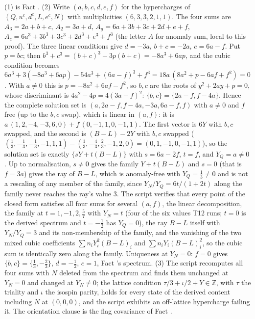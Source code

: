 (1) is Fact . (2) Write $(a, b, c, d, e, f)$ for the hypercharges of $(Q, u^{c}, d^{c}, L, e^{c}, N)$ with multiplicities $(6, 3, 3, 2, 1, 1)$. The four sums are $A_{3} = 2a + b + c$, $A_{2} = 3a + d$, $A_{g} = 6a + 3b + 3c + 2d + e + f$, $A_{c} = 6a^{3} + 3b^{3} + 3c^{3} + 2d^{3} + e^{3} + f^{3}$ (the letter $A$ for anomaly sum, local to this proof). The three linear conditions give $d = -3a$, $b + c = -2a$, $e = 6a - f$. Put $p = bc$; then $b^{3} + c^{3} = (b + c)^{3} - 3p(b + c) = -8a^{3} + 6ap$, and the cubic condition becomes $6a^{3} + 3(-8a^{3} + 6ap) - 54a^{3} + (6a - f)^{3} + f^{3} = 18a\,(8a^{2} + p - 6af + f^{2}) = 0$. With $a \neq 0$ this is $p = -8a^{2} + 6af - f^{2}$, so $b, c$ are the roots of $y^{2} + 2ay + p = 0$, whose discriminant is $4a^{2} - 4p = 4(3a - f)^{2}$: $\{b, c\} = \{2a - f, f - 4a\}$. Hence the complete solution set is $(a, 2a - f, f - 4a, -3a, 6a - f, f)$ with $a \neq 0$ and $f$ free (up to the $b, c$ swap), which is linear in $(a, f)$: it is $a\,(1, 2, -4, -3, 6, 0) + f\,(0, -1, 1, 0, -1, 1)$. The first vector is $6Y$ with $b, c$ swapped, and the second is $(B - L) - 2Y$ with $b, c$ swapped ($(\tfrac13, -\tfrac13, -\tfrac13, -1, 1, 1) - (\tfrac13, -\tfrac43, \tfrac23, -1, 2, 0) = (0, 1, -1, 0, -1, 1)$), so the solution set is exactly $\{sY + t(B - L)\}$ with $s = 6a - 2f$, $t = f$, and $Y_{Q} = a \neq 0$. Up to normalisation, $s \neq 0$ gives the family $Y + t(B - L)$ and $s = 0$ (that is $f = 3a$) gives the ray of $B - L$, which is anomaly-free with $Y_{Q} = \tfrac13 \neq 0$ and is not a rescaling of any member of the family, since $Y_{N}/Y_{Q} = 6t/(1 + 2t)$ along the family never reaches the ray's value $3$. The script verifies that every point of the closed form satisfies all four sums for several $(a, f)$, the linear decomposition, the family at $t = 1, -1, 2, \tfrac57$ with $Y_{N} = t$ (four of the six values T12 runs; $t = 0$ is the derived spectrum and $t = -\tfrac12$ has $Y_{Q} = 0$), the ray $B - L$ itself with $Y_{N}/Y_{Q} = 3$ and its non-membership of the family, and the vanishing of the two mixed cubic coefficients $\sum n_{i}Y_{i}^{2}(B - L)_{i}$ and $\sum n_{i}Y_{i}(B - L)_{i}^{2}$, so the cubic sum is identically zero along the family. Uniqueness at $Y_{N} = 0$: $f = 0$ gives $\{b, c\} = \{\tfrac13, -\tfrac23\}$, $d = -\tfrac12$, $e = 1$, Fact 's spectrum. (3) The script recomputes all four sums with $N$ deleted from the spectrum and finds them unchanged at $Y_{N} = 0$ and changed at $Y_{N} \neq 0$; the lattice condition $\tau/3 + \iota/2 + Y \in \mathbb{Z}$, with $\tau$ the triality and $\iota$ the isospin parity, holds for every state of the derived content including $N$ at $(0, 0, 0)$, and the script exhibits an off-lattice hypercharge failing it. The orientation clause is the flag covariance of Fact .
